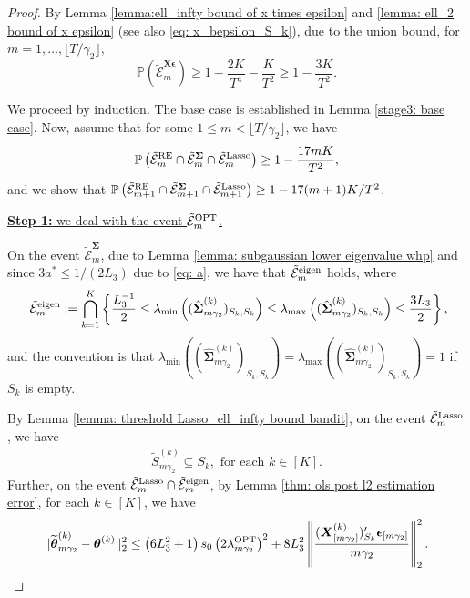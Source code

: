 \documentclass[aos,preprint]{imsart}
\theoremstyle{plain}
\theoremstyle{definition}
\newcommand{\btheta}{\boldsymbol{\theta}}
\newcommand{\bd}[1]{\boldsymbol{#1}}
\newcommand{\bX}{\boldsymbol{X}}
\newcommand{\bSigma}{\boldsymbol{\Sigma}}
\newcommand{\lmin}[1]{\lambda_{\min}\left(#1\right)}
\newcommand{\lmax}[1]{\lambda_{\max}\left(#1\right)}
\newcommand{\tbtheta}{\widetilde{\boldsymbol{\theta}}}
\newcommand{\hdlambda}{\lambda^{\textup{OPT}}}
\newcommand{\tS}{\tilde{S}}
\newcommand{\mE}{\mathcal{E}}
\newcommand{\hbSigma}{\hat{\boldsymbol{\Sigma}}}
\newcommand{\bepsilon}{\bd{\epsilon}}
\newcommand{\Pro}{\mathbb{P}}
\begin{document}
\begin{appendix}
\begin{proof}
By Lemma \ref{lemma:ell_infty bound of x times epsilon} and \ref{lemma: ell_2 bound of x epsilon} (see also \eqref{eq: x_bepsilon_S_k}), due to the union bound, for $m = 1,\ldots,\lfloor T/\gamma_2 \rfloor$,
\begin{equation}\label{eq: stage 3 E infty prob}
    \Pro(\tilde{\mE}_{m}^{\bX\bepsilon})\ge 1- \frac{2K}{T^4} - \frac{K}{T^2} \geq 1- \frac{3K}{T^2}.
\end{equation}

We proceed by induction. The base case is established in Lemma  \ref{stage3: base case}. Now,   assume that for some $1\leq m < \lfloor T/\gamma_2 \rfloor$, we have 
\begin{align}
    \label{stage 3:inductive_hypothesis}
\Pro\left(\tilde{\mE}_m^{\textup{RE}} \cap \tilde{\mE}_m^{\bSigma} \cap  \tilde{\mE}_m^{\textup{Lasso}}\right) \geq 1-\frac{17mK}{T^2},
\end{align}
and we show that $\Pro\left(\tilde{\mE}_{m+1}^{\textup{RE}} \cap \tilde{\mE}_{m+1}^{\bSigma} \cap  \tilde{\mE}_{m+1}^{\textup{Lasso}}\right) \geq 1-{17(m+1)K}/{T^2}$.

\medskip
\noindent \underline{\textbf{Step 1:} we deal with the event 
$\tilde{\mE}_{m}^{\textup{OPT}}$.}

On the event $\tilde{\mE}_{m}^{\bSigma}$, due to Lemma \ref{lemma: subgaussian lower eigenvalue whp} and since $3a^* \leq 1/(2L_3)$ due to \eqref{eq: a}, we have  that $\tilde{\mE}_{m}^{\textup{eigen}}$ holds, where
\begin{equation*}
    \   \tilde{\mE}_m^{\textup{eigen}} := \bigcap_{k = 1}^{K}\left\{\frac{L_3^{-1}}{2} \le \lmin{(\hbSigma_{m\gamma_2}^{(k)})_{S_k, S_k}} \le \lmax{(\hbSigma_{m\gamma_2}^{(k)})_{S_k, S_k}} \le \frac{3L_3}{2}\right\}, 
\end{equation*}
 and the convention is that $\lmin{(\hbSigma_{m\gamma_2}^{(k)})_{S_k, S_k}} = \lmax{(\hbSigma_{m\gamma_2}^{(k)})_{S_k, S_k}} = 1$ if $S_k$ is empty.


By Lemma \ref{lemma: threshold Lasso_ell_infty bound bandit}, on the event $\tilde{\mE}_{m}^{\textup{Lasso}}$, we have
\begin{align*}
\tS_{m\gamma_2}^{(k)}  \subseteq S_k, \text{ for each } k \in [K].
\end{align*}
Further, on the event $\tilde{\mE}_{m}^{\textup{Lasso}} \cap \tilde{\mE}_{m}^{\textup{eigen}}$, by Lemma \ref{thm: ols post l2 estimation error}, for each $k \in [K]$, we have
\begin{align*}
    \|\tbtheta_{m\gamma_2}^{(k)}-\btheta^{(k)}\|_2^2 \leq \left(6L_3^2  + 1\right) s_0 \left(2\hdlambda_{m\gamma_2}\right)^2 + 8L_3^2 \left\|\frac{(\bX_{[m\gamma_2]}^{(k)})_{S_k}'\bepsilon_{[m\gamma_2]}}{m\gamma_2}\right\|_2^2.
 \end{align*}


\end{proof}
\end{appendix}
\end{document}
